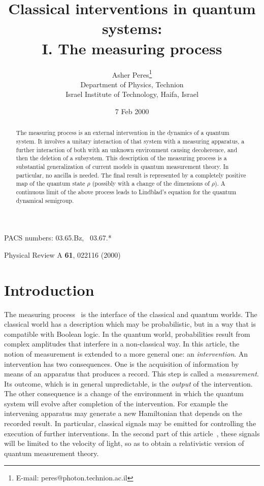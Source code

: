 \documentclass[12pt]{article}
\begin{document}
\renewcommand{\thefootnote}{\fnsymbol{footnote}}

\title{Classical interventions in quantum systems:\\ 
I. The measuring process}

\author{Asher Peres\footnote{E-mail: peres@photon.technion.ac.il} \\
Department of Physics, Technion\\
Israel Institute of Technology, Haifa, Israel}

\date{7 Feb 2000}
\maketitle

\begin{abstract}
The measuring process is an external intervention in the dynamics of a
quantum system. It involves a unitary interaction of that system with a
measuring apparatus, a further interaction of both with an unknown
environment causing decoherence, and then the deletion of a subsystem.
This description of the measuring process is a substantial
generalization of current models in quantum measurement theory. In
particular, no ancilla is needed. The final result is represented by a
completely positive map of the quantum state $\rho$ (possibly with a
change of the dimensions of $\rho$). A continuous limit of the above
process leads to Lindblad's equation for the quantum dynamical
semigroup.
\end{abstract}

\medskip

\noindent PACS numbers: 03.65.Bz, \ 03.67.* \vfill

\noindent Physical Review A {\bf61}, 022116 (2000) \vfill

\section{Introduction}

The measuring process~\cite{vN,WZ} is the interface of the classical and
quantum worlds. The classical world has a description which may be
probabilistic, but in a way that is compatible with Boolean logic. In
the quantum world, probabilities result from complex amplitudes that
interfere in a non-classical way. In this article, the notion of
measurement is extended to a more general one: an {\it intervention\/}.
An intervention has two consequences. One is the acquisition of
information by means of an apparatus that produces a record. This step
is called a {\it measurement\/}. Its outcome, which is in general
unpredictable, is the {\it output\/} of the intervention. The other
consequence is a change of the environment in which the quantum system
will evolve after completion of the intervention. For example the
intervening apparatus may generate a new Hamiltonian that depends on the
recorded result. In particular, classical signals may be emitted for
controlling the execution of further interventions. In the second part
of this article~\cite{II}, these signals will be limited to the velocity
of light, so as to obtain a relativistic version of quantum measurement
theory.
\end{document}
